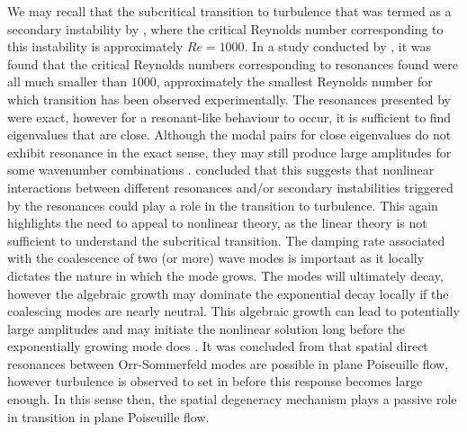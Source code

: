 \documentclass[a4paper, 12pt, twoside, openright]{article}
\numberwithin{equation}{section}
\begin{document}
We may recall that the subcritical transition to turbulence that was termed as a secondary instability by \cite{OrszagPatera83}, where the critical Reynolds number corresponding to this instability is approximately $Re=1000$. In a study conducted by \cite{Gustavsson81}, it was found that the critical Reynolds numbers corresponding to resonances found were all much smaller than $1000$, approximately the smallest Reynolds number for which transition has been observed experimentally. The resonances presented by \cite{Gustavsson81} were exact, however for a resonant-like behaviour to occur, it is sufficient to find eigenvalues that are close. Although the modal pairs for close eigenvalues do not exhibit resonance in the exact sense, they may still produce large amplitudes for some wavenumber combinations \citep{Gustavsson81}. \cite{Gustavsson81} concluded that this suggests that nonlinear interactions between different resonances and/or secondary instabilities triggered by the resonances could play a role in the transition to turbulence. This again highlights the need to appeal to nonlinear theory, as the linear theory is not sufficient to understand the subcritical transition. The damping rate associated with the coalescence of two (or more) wave modes is important as it locally dictates the nature in which the mode grows. The modes will ultimately decay, however the algebraic growth may dominate the exponential decay locally if the coalescing modes are nearly neutral. This algebraic growth can lead to potentially large amplitudes and may initiate the nonlinear solution long before the exponentially growing mode does \citep{Koch86}. It was concluded from \cite{Koch86} that spatial direct resonances between Orr-Sommerfeld modes are possible in plane Poiseuille flow, however turbulence is observed to set in before this response becomes large enough. In this sense then, the spatial degeneracy mechanism plays a passive role in transition in plane Poiseuille flow. %
\end{document}
